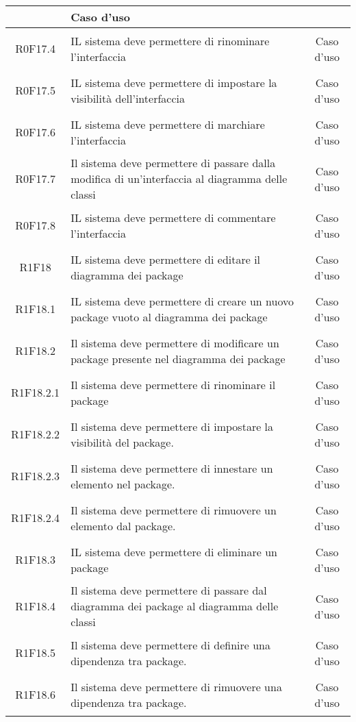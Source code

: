 \documentclass[../AnalisiDeiRequisiti.tex]{subfiles}
\begin{document}
\begin{longtable}{|c|>{\centering}p{7cm}|c|}
& Caso d'uso \\ \hline
\hypertarget{R0F17.4}{R0F17.4} & IL sistema deve permettere di rinominare l'interfaccia & Caso d'uso \\ \hline
\hypertarget{R0F17.5}{R0F17.5} & IL sistema deve permettere di impostare la visibilità dell'interfaccia & Caso d'uso \\ \hline
\hypertarget{R0F17.6}{R0F17.6} & IL sistema deve permettere di marchiare l'interfaccia & Caso d'uso \\ \hline
\hypertarget{R0F17.7}{R0F17.7} & Il sistema deve permettere di passare dalla modifica di un'interfaccia al diagramma delle classi & Caso d'uso \\ \hline
\hypertarget{R0F17.8}{R0F17.8} & IL sistema deve permettere di commentare l'interfaccia & Caso d'uso \\ \hline
\hypertarget{R1F18}{R1F18} & IL sistema deve permettere di editare il diagramma dei package & Caso d'uso \\ \hline
\hypertarget{R1F18.1}{R1F18.1} & IL sistema deve permettere di creare un nuovo package vuoto al diagramma dei package & Caso d'uso \\ \hline
\hypertarget{R1F18.2}{R1F18.2} & Il sistema deve permettere di modificare un package presente nel diagramma dei package & Caso d'uso \\ \hline
\hypertarget{R1F18.2.1}{R1F18.2.1} & Il sistema deve permettere di rinominare il package & Caso d'uso \\ \hline
\hypertarget{R1F18.2.2}{R1F18.2.2} & Il sistema deve permettere di impostare la visibilità del package. & Caso d'uso \\ \hline
\hypertarget{R1F18.2.3}{R1F18.2.3} & Il sistema deve permettere di innestare un elemento nel package. & Caso d'uso \\ \hline
\hypertarget{R1F18.2.4}{R1F18.2.4} & Il sistema deve permettere di rimuovere un elemento dal package. & Caso d'uso \\ \hline
\hypertarget{R1F18.3}{R1F18.3} & IL sistema deve permettere di eliminare un package & Caso d'uso \\ \hline
\hypertarget{R1F18.4}{R1F18.4} & Il sistema deve permettere di passare dal diagramma dei package al diagramma delle classi & Caso d'uso \\ \hline
\hypertarget{R1F18.5}{R1F18.5} & Il sistema deve permettere di definire una dipendenza tra package. & Caso d'uso \\ \hline
\hypertarget{R1F18.6}{R1F18.6} & Il sistema deve permettere di rimuovere una dipendenza tra package. & Caso d'uso \\ \hline

\end{longtable}
\end{document}
